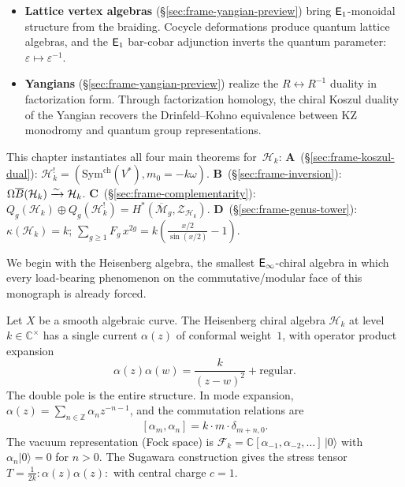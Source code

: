 \begin{itemize}
\item \textbf{Lattice vertex algebras}
  (\S\ref{sec:frame-yangian-preview}) bring $\mathsf{E}_1$-monoidal
  structure from the braiding.  Cocycle deformations produce quantum
  lattice algebras, and the $\mathsf{E}_1$ bar-cobar adjunction inverts
  the quantum parameter: $\varepsilon \mapsto \varepsilon^{-1}$.

\item \textbf{Yangians} (\S\ref{sec:frame-yangian-preview}) realize
  the $R \leftrightarrow R^{-1}$ duality in factorization form.
  Through factorization homology, the chiral Koszul duality of the
  Yangian recovers the Drinfeld--Kohno equivalence between KZ
  monodromy and quantum group representations.
\end{itemize}

\begin{remark}%
\label{rem:frame-governing-picture}
This chapter instantiates all four main theorems for~$\mathcal{H}_k$:
\textbf{A}~(\S\ref{sec:frame-koszul-dual}): $\mathcal{H}_k^! = (\mathrm{Sym}^{\mathrm{ch}}(V^*), m_0 = -k\omega)$.
\textbf{B}~(\S\ref{sec:frame-inversion}): $\Omega\overline{B}(\mathcal{H}_k) \xrightarrow{\sim} \mathcal{H}_k$.
\textbf{C}~(\S\ref{sec:frame-complementarity}): $Q_g(\mathcal{H}_k) \oplus Q_g(\mathcal{H}_k^!) = H^*(\overline{\mathcal{M}}_g, \mathcal{Z}_{\mathcal{H}_k})$.
\textbf{D}~(\S\ref{sec:frame-genus-tower}): $\kappa(\mathcal{H}_k) = k$; $\sum_{g \geq 1} F_g\, x^{2g} = k(\tfrac{x/2}{\sin(x/2)} - 1)$.
\end{remark}

\medskip

We begin with the Heisenberg algebra, the smallest $\mathsf{E}_{\infty}$-chiral
algebra in which every load-bearing phenomenon on the
commutative/modular face of this monograph is already forced.

Let $X$ be a smooth algebraic curve.  The Heisenberg chiral algebra
$\mathcal{H}_k$ at level $k \in \mathbb{C}^\times$ has a single current
$\alpha(z)$ of conformal weight~$1$, with operator product expansion
\begin{equation}\label{eq:frame-heisenberg-ope}
\alpha(z)\alpha(w) = \frac{k}{(z-w)^2} + \text{regular}.
\end{equation}
The double pole is the entire structure.  In mode expansion,
$\alpha(z) = \sum_{n \in \mathbb{Z}} \alpha_n z^{-n-1}$, and the
commutation relations are
\begin{equation}\label{eq:frame-heisenberg-modes}
[\alpha_m, \alpha_n] = k \cdot m \cdot \delta_{m+n,0}.
\end{equation}
The vacuum representation (Fock space) is
$\mathcal{F}_k = \mathbb{C}[\alpha_{-1}, \alpha_{-2}, \ldots]\,|0\rangle$
with $\alpha_n|0\rangle = 0$ for $n > 0$.  The Sugawara construction gives
the stress tensor $T = \frac{1}{2k}:\!\alpha(z)\alpha(z)\!:$ with central
charge $c = 1$.

